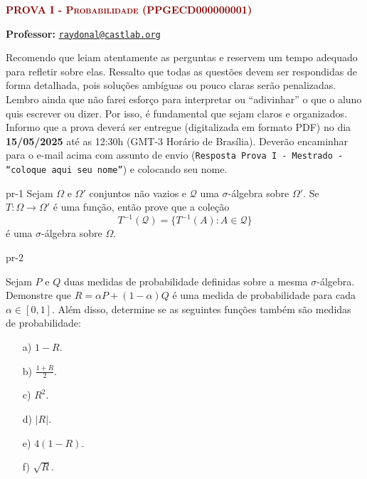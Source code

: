 




% 


{\scshape\bf\textcolor{darkred}{PROVA I - Probabilidade (PPGECD000000001)}}


\textsf{\textbf{Professor:}}    \href{mailto:raydonal@castlab.org}{\texttt{raydonal@castlab.org}}

\bigskip 
\begin{regras}
Recomendo que leiam atentamente as perguntas e reservem um tempo adequado para refletir sobre elas. Ressalto que todas as questões devem ser respondidas de forma detalhada, pois soluções ambíguas ou pouco claras serão penalizadas. Lembro ainda que não farei esforço para interpretar ou ``adivinhar'' o que o aluno quis escrever ou dizer. Por isso, é fundamental que sejam claros e organizados. Informo que a prova deverá ser entregue (digitalizada em formato PDF) no dia {\bf 15/05/2025} até as 12:30h (GMT-3 Horário de Brasília). Deverão encaminhar para o e-mail acima com assunto de envio ({\tt Resposta Prova I - Mestrado - ``coloque aqui seu  nome''})  e colocando seu nome.
\end{regras}
\vspace{2ex}


\begin{problema}{}{pr-1}
Sejam $\Omega$ e $\Omega'$ conjuntos não vazios e $\mathcal{Q}$ uma $\sigma$-álgebra sobre $\Omega'$.
Se $T \colon \Omega \to \Omega'$ é uma função, então prove que a coleção
\[
T^{-1}(\mathcal{Q}) = \{ T^{-1}(A) : A \in \mathcal{Q} \}
\]
é uma $\sigma$-álgebra sobre $\Omega$.
\end{problema}



\begin{problema}{}{pr-2}
	
Sejam $P$ e $Q$ duas medidas de probabilidade definidas sobre a mesma $\sigma$-álgebra.
Demonstre que $R = \alpha P + (1 - \alpha) Q$ é uma medida de probabilidade para cada $\alpha \in [0, 1]$. Além disso, determine se as seguintes funções também são medidas de probabilidade:

\begin{enumerate}
	\item[a)] $1 - R$.
	\item[b)] $\frac{1 + R}{2}$.
	\item[c)] $R^2$.
	\item[d)] $|R|$.
	\item[e)] $4(1 - R)$.
	\item[f)] $\sqrt{R}$.
	\end{enumerate}
\end{problema}


